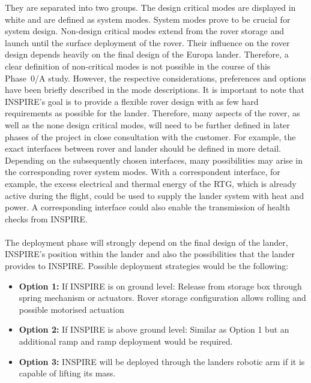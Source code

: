 They are separated into two groups. The design critical modes are displayed in white and are defined as system modes. System modes prove to be crucial for system design. Non-design critical modes extend from the rover storage and launch until the surface deployment of the rover. Their influence on the rover design depends heavily on the final design of the Europa lander. Therefore, a clear definition of non-critical modes is not possible in the course of this Phase~0/A study. However, the respective considerations, preferences and options have been briefly described in the mode descriptions. It is important to note that INSPIRE's goal is to provide a flexible rover design with as few hard requirements as possible for the lander. Therefore, many aspects of the rover, as well as the none design critical modes, will need to be further defined in later phases of the project in close consultation with the customer.
For example, the exact interfaces between rover and lander should be defined in more detail. Depending on the subsequently chosen interfaces, many possibilities may arise in the corresponding rover system modes. With a correspondent interface, for example, the excess electrical and thermal energy of the RTG, which is already active during the flight, could be used to supply the lander system with heat and power. A corresponding interface could also enable the transmission of health checks from INSPIRE. \\ \\
The deployment phase will strongly depend on the final design of the lander, INSPIRE's position within the lander and also the possibilities that the lander provides to INSPIRE.
Possible deployment strategies would be the following:

\begin{itemize}
\itemsep0pt
\item	\textbf{Option 1:} If INSPIRE is on ground level: Release from storage box through spring mechanism or actuators. Rover storage configuration allows rolling and possible motorised actuation
\item	\textbf{Option 2:} If INSPIRE is above ground level: Similar as Option 1 but an additional ramp and ramp deployment would be required.
\item	\textbf{Option 3:} INSPIRE will be deployed through the landers robotic arm if it is capable of lifting its mass.
\end{itemize}
